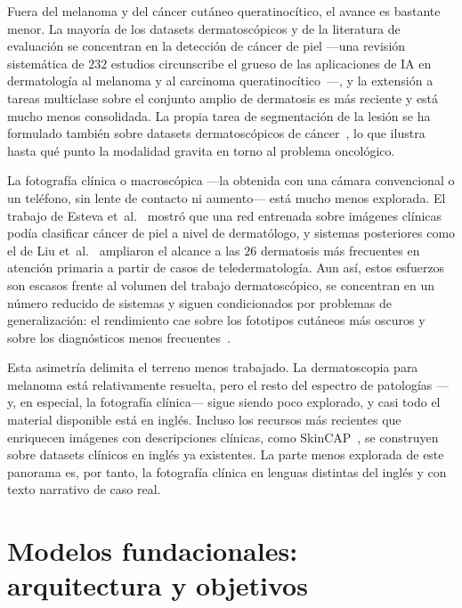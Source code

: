 Fuera del melanoma y del cáncer cutáneo queratinocítico, el avance es
bastante menor. La mayoría de los datasets dermatoscópicos y de la
literatura de evaluación se concentran en la detección de cáncer de
piel ---una revisión sistemática de $232$ estudios circunscribe el
grueso de las aplicaciones de IA en dermatología al melanoma y al
carcinoma queratinocítico~\cite{jairath2024}---, y la extensión a
tareas multiclase sobre el conjunto amplio de
dermatosis es más reciente y está mucho menos consolidada. La propia
tarea de segmentación de la lesión se ha formulado también sobre
datasets dermatoscópicos de cáncer~\cite{isic2018}, lo que ilustra
hasta qué punto la modalidad gravita en torno al problema oncológico.

La fotografía clínica o macroscópica ---la obtenida con una cámara
convencional o un teléfono, sin lente de contacto ni aumento--- está
mucho menos explorada. El trabajo de Esteva et~al.~\cite{esteva2017}
mostró que una red entrenada sobre imágenes clínicas podía clasificar
cáncer de piel a nivel de dermatólogo, y sistemas posteriores como el
de Liu et~al.~\cite{liu2020} ampliaron el alcance a las $26$
dermatosis más frecuentes en atención primaria a partir de casos de
teledermatología. Aun así, estos esfuerzos son escasos frente al
volumen del trabajo dermatoscópico, se concentran en un número
reducido de sistemas y siguen condicionados por problemas de
generalización: el rendimiento cae sobre los fototipos cutáneos más
oscuros y sobre los diagnósticos menos
frecuentes~\cite{ddi,fitzpatrick17k,tjiu2025}.

Esta asimetría delimita el terreno menos trabajado. La dermatoscopia
para melanoma está relativamente resuelta, pero el resto del espectro
de patologías ---y, en especial, la fotografía clínica--- sigue siendo
poco explorado, y casi todo el material disponible está en inglés.
Incluso los recursos más recientes que enriquecen imágenes con
descripciones clínicas, como SkinCAP~\cite{skincap2024}, se construyen
sobre datasets clínicos en inglés ya existentes. La parte menos
explorada de este panorama es, por tanto, la fotografía clínica en
lenguas distintas del inglés y con texto narrativo de caso real.

\section{Modelos fundacionales: arquitectura y objetivos}
\label{sec:fundacionales-base}

